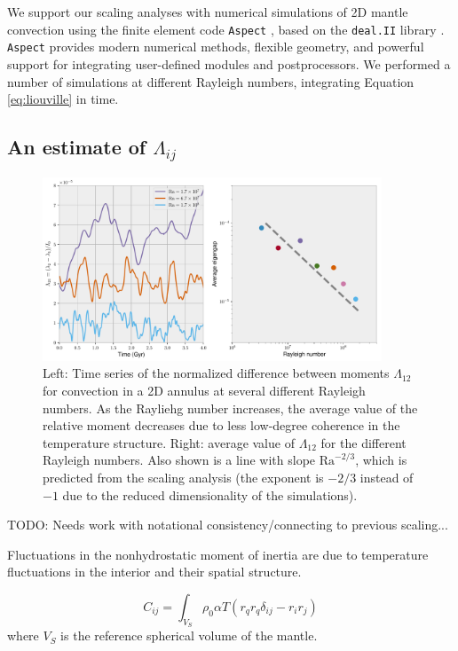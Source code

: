 \documentclass[extra,mreferee]{gji}
\begin{document}
We support our scaling analyses with numerical simulations of 2D mantle convection using the finite element code \texttt{Aspect} \citep{kronbichler2012high}, based on the \texttt{deal.II} library \citep{dealII81}.  
\texttt{Aspect} provides modern numerical methods, flexible geometry, and powerful support for integrating user-defined modules and postprocessors.
We performed a number of simulations at different Rayleigh numbers, integrating Equation \ref{eq:liouville} in time.

\subsection{An estimate of $\Lambda_{ij}$}

\begin{figure}
\centering
\label{misfit}
\includegraphics[width=0.9\textwidth]{figures/eigengap.pdf}
\caption{ Left: Time series of the normalized difference between moments $\Lambda_{12}$ for convection in a 2D annulus at several different Rayleigh numbers.  As the Rayliehg number increases, the average value of the relative moment decreases due to less low-degree coherence in the temperature structure.  Right:  average value of $\Lambda_{12}$ for the different Rayleigh numbers.  Also shown is a line with slope $\mathrm{Ra}^{-2/3}$, which is predicted from the scaling analysis (the exponent is $-2/3$ instead of $-1$ due to the reduced dimensionality of the simulations).}
\end{figure}

TODO: Needs work with notational consistency/connecting to previous scaling...

Fluctuations in the nonhydrostatic moment of inertia are due to temperature fluctuations in the interior and their spatial structure.

\begin{equation}
C_{ij} = \int_{V_S} \rho_0 \alpha T \left( r_q r_q \delta_{ij} - r_i r_j \right) 
\end{equation}
where $V_S$ is the reference spherical volume of the mantle.
\end{document}
